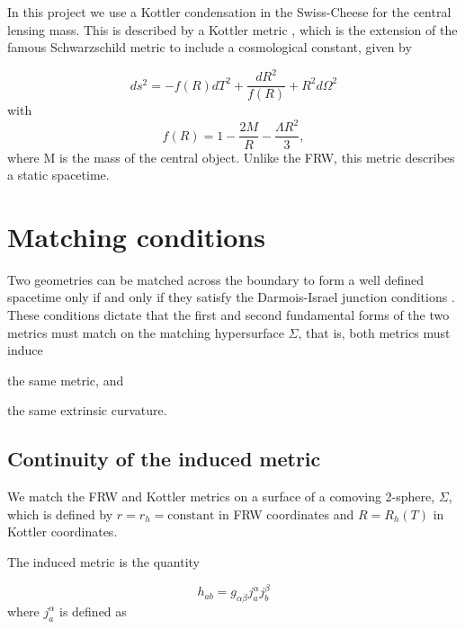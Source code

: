 In this project we use a Kottler condensation in the Swiss-Cheese for the central lensing mass. This is described by a Kottler metric \citep{kottler1918physikalischen}, which is the extension of the famous Schwarzschild metric to include a cosmological constant, given by

\begin{equation}
  ds^2 = -f(R)dT^2 + \frac{dR^2}{f(R)} + R^2 d \Omega^2
  \label{eq:kottler-metric}
\end{equation}
with
\begin{equation}
  f(R) = 1-\frac{2M}{R} - \frac{\Lambda R^2}{3},
  \label{eq:kottler-metric-f}
\end{equation}
where M is the mass of the central object. Unlike the FRW, this metric describes a static spacetime. 

\section{Matching conditions}

Two geometries can be matched across the boundary to form a well defined spacetime only if and only if they satisfy the Darmois-Israel junction conditions \citep{darmois1927equations,israel1966singular}. These conditions dictate that the first and second fundamental forms of the two metrics must match on the matching hypersurface $\Sigma$, that is, both metrics must induce 
\begin{inparaenum}[(i)]
  \item the same metric, and 
  \item the same extrinsic curvature.
\end{inparaenum}

\subsection{Continuity of the induced metric}

We match the FRW and Kottler metrics on a surface of a comoving 2-sphere, $\Sigma$, which is defined by $r = r_h = \text{constant}$ in FRW coordinates and $R = R_h(T)$ in Kottler coordinates.

The induced metric is the quantity 

\begin{equation}
  h_{ab} = g_{\alpha \beta} j^{\alpha}_{a} j^{\beta}_{b}
  \label{eq:induced-metric-defn}
\end{equation}
where $j^{\alpha}_{a}$ is defined as

